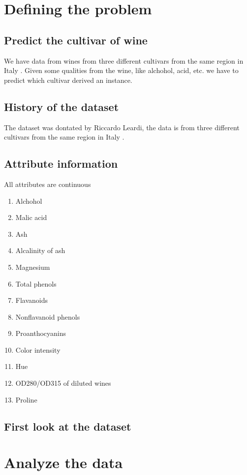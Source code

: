 \chapter{Defining the problem}

\section{Predict the cultivar of wine}
We have data from wines from three different cultivars from the same region in Italy \cite{info}. Given some qualities from the wine, like alchohol, acid, etc. we have to predict which cultivar derived an instance.

\section{History of the dataset}
The dataset was dontated by Riccardo Leardi, the data is from three different cultivars from the same region in Italy \cite{info}.

\section{Attribute information}
All attributes are continuous
\begin{enumerate}
    \item Alchohol 
    \item Malic acid
    \item Ash
    \item Alcalinity of ash
    \item Magnesium
    \item Total phenols 
    \item Flavanoids
    \item Nonflavanoid phenols
    \item Proanthocyanins 
    \item Color intensity 
    \item Hue 
    \item OD280/OD315 of diluted wines 
    \item Proline
\end{enumerate}

\section{First look at the dataset}
\chapter{Analyze the data}
